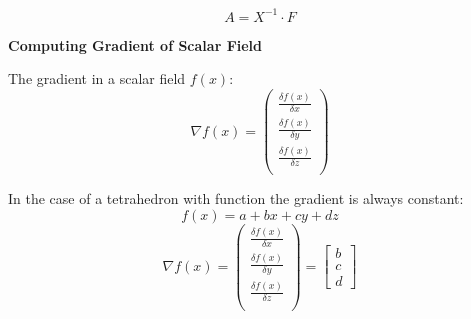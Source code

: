 $$A = X^{-1} \cdot F$$

\textbf{Computing Gradient of Scalar Field}

The gradient in a scalar field $f(x)$:
$$\nabla f(x) = \begin{pmatrix}
    \frac{\delta f(x)}{\delta x} \\
    \frac{\delta f(x)}{\delta y} \\
    \frac{\delta f(x)}{\delta z} \\
\end{pmatrix}$$

In the case of a tetrahedron with function the gradient is always constant:
$$f(x) = a + bx + cy + dz$$
$$\nabla f(x) = \begin{pmatrix}
    \frac{\delta f(x)}{\delta x} \\
    \frac{\delta f(x)}{\delta y} \\
    \frac{\delta f(x)}{\delta z} \\
\end{pmatrix} = \begin{bmatrix}
    b \\ c \\ d
\end{bmatrix}$$